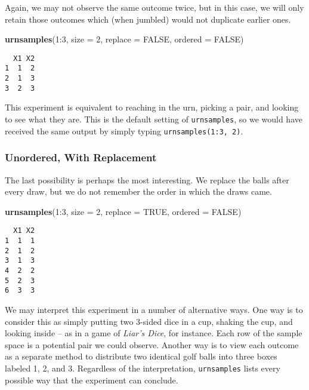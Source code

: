 \documentclass[]{book}
\newenvironment{Shaded}{\begin{snugshade}}{\end{snugshade}}
\newcommand{\KeywordTok}[1]{\textcolor[rgb]{0.13,0.29,0.53}{\textbf{{#1}}}}
\newcommand{\DataTypeTok}[1]{\textcolor[rgb]{0.13,0.29,0.53}{{#1}}}
\newcommand{\DecValTok}[1]{\textcolor[rgb]{0.00,0.00,0.81}{{#1}}}
\newcommand{\OtherTok}[1]{\textcolor[rgb]{0.56,0.35,0.01}{{#1}}}
\newcommand{\NormalTok}[1]{{#1}}
\numberwithin{equation}{chapter}
\numberwithin{figure}{chapter}
\theoremstyle{plain}
\theoremstyle{definition}
\theoremstyle{remark}
\theoremstyle{definition}
\theoremstyle{definition}
\theoremstyle{remark}
\begin{document}
Again, we may not observe the same outcome twice, but in this case, we
will only retain those outcomes which (when jumbled) would not duplicate
earlier ones.

\begin{Shaded}
\begin{Highlighting}[]
\KeywordTok{urnsamples}\NormalTok{(}\DecValTok{1}\NormalTok{:}\DecValTok{3}\NormalTok{, }\DataTypeTok{size =} \DecValTok{2}\NormalTok{, }\DataTypeTok{replace =} \OtherTok{FALSE}\NormalTok{, }\DataTypeTok{ordered =} \OtherTok{FALSE}\NormalTok{) }
\end{Highlighting}
\end{Shaded}

\begin{verbatim}
  X1 X2
1  1  2
2  1  3
3  2  3
\end{verbatim}

This experiment is equivalent to reaching in the urn, picking a pair,
and looking to see what they are. This is the default setting of
\texttt{urnsamples}, so we would have received the same output by simply
typing \texttt{urnsamples(1:3,\ 2)}.

\subsubsection{Unordered, With
Replacement}\label{unordered-with-replacement}

The last possibility is perhaps the most interesting. We replace the
balls after every draw, but we do not remember the order in which the
draws came.

\begin{Shaded}
\begin{Highlighting}[]
\KeywordTok{urnsamples}\NormalTok{(}\DecValTok{1}\NormalTok{:}\DecValTok{3}\NormalTok{, }\DataTypeTok{size =} \DecValTok{2}\NormalTok{, }\DataTypeTok{replace =} \OtherTok{TRUE}\NormalTok{, }\DataTypeTok{ordered =} \OtherTok{FALSE}\NormalTok{) }
\end{Highlighting}
\end{Shaded}

\begin{verbatim}
  X1 X2
1  1  1
2  1  2
3  1  3
4  2  2
5  2  3
6  3  3
\end{verbatim}

We may interpret this experiment in a number of alternative ways. One
way is to consider this as simply putting two 3-sided dice in a cup,
shaking the cup, and looking inside -- as in a game of \emph{Liar's
Dice}, for instance. Each row of the sample space is a potential pair we
could observe. Another way is to view each outcome as a separate method
to distribute two identical golf balls into three boxes labeled 1, 2,
and 3. Regardless of the interpretation, \texttt{urnsamples} lists every
possible way that the experiment can conclude.
\end{document}
